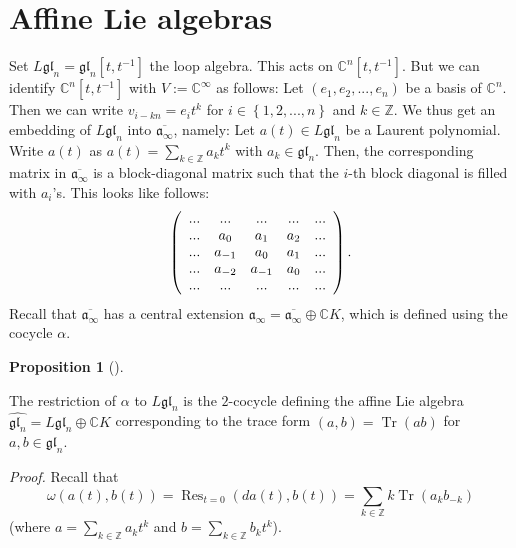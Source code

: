 \documentclass
[numbers=enddot,12pt,final,onecolumn,german,notitlepage]{scrartcl}%
\theoremstyle{definition}
\newtheorem{prop}[theo]{Proposition}
\newenvironment{proposition}[1][]
{\begin{prop}[#1]\begin{leftbar}}
{\end{leftbar}\end{prop}}
\begin{document}
\section{Affine Lie algebras}

Set $L\mathfrak{gl}_{n}=\mathfrak{gl}_{n}\left[  t,t^{-1}\right]  $ the loop
algebra. This acts on $\mathbb{C}^{n}\left[  t,t^{-1}\right]  $. But we can
identify $\mathbb{C}^{n}\left[  t,t^{-1}\right]  $ with $V:=\mathbb{C}%
^{\infty}$ as follows: Let $\left(  e_{1},e_{2},...,e_{n}\right)  $ be a basis
of $\mathbb{C}^{n}$. Then we can write $v_{i-kn}=e_{i}t^{k}$ for $i\in\left\{
1,2,...,n\right\}  $ and $k\in\mathbb{Z}$. We thus get an embedding of
$L\mathfrak{gl}_{n}$ into $\overline{\mathfrak{a}_{\infty}}$, namely: Let
$a\left(  t\right)  \in L\mathfrak{gl}_{n}$ be a Laurent polynomial. Write
$a\left(  t\right)  $ as $a\left(  t\right)  =\sum\limits_{k\in\mathbb{Z}%
}a_{k}t^{k}$ with $a_{k}\in\mathfrak{gl}_{n}$. Then, the corresponding matrix
in $\overline{\mathfrak{a}_{\infty}}$ is a block-diagonal matrix such that the
$i$-th block diagonal is filled with $a_{i}$'s. This looks like follows:%
\[
\left(
\begin{array}
[c]{ccccc}%
... & ... & ... & ... & ...\\
... & a_{0} & a_{1} & a_{2} & ...\\
... & a_{-1} & a_{0} & a_{1} & ...\\
... & a_{-2} & a_{-1} & a_{0} & ...\\
... & ... & ... & ... & ...
\end{array}
\right)  .
\]
Recall that $\overline{\mathfrak{a}_{\infty}}$ has a central extension
$\mathfrak{a}_{\infty}=\overline{\mathfrak{a}_{\infty}}\oplus\mathbb{C}K$,
which is defined using the cocycle $\alpha$.

\begin{proposition}
The restriction of $\alpha$ to $L\mathfrak{gl}_{n}$ is the $2$-cocycle
defining the affine Lie algebra $\widehat{\mathfrak{gl}_{n}}=L\mathfrak{gl}%
_{n}\oplus\mathbb{C}K$ corresponding to the trace form $\left(  a,b\right)
=\operatorname*{Tr}\left(  ab\right)  $ for $a,b\in\mathfrak{gl}_{n}$.
\end{proposition}

\textit{Proof.} Recall that%
\[
\omega\left(  a\left(  t\right)  ,b\left(  t\right)  \right)
=\operatorname*{Res}\nolimits_{t=0}\left(  da\left(  t\right)  ,b\left(
t\right)  \right)  =\sum\limits_{k\in\mathbb{Z}}k\operatorname*{Tr}\left(
a_{k}b_{-k}\right)
\]
(where $a=\sum\limits_{k\in\mathbb{Z}}a_{k}t^{k}$ and $b=\sum\limits_{k\in
\mathbb{Z}}b_{k}t^{k}$).
\end{document}
